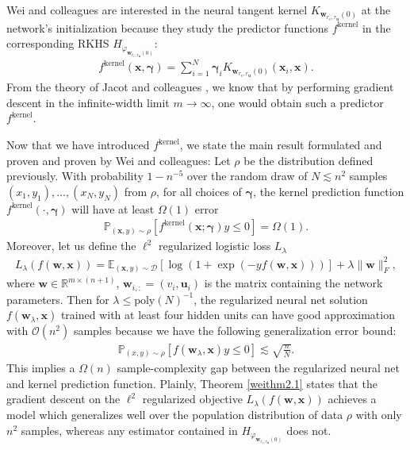 \documentclass{article}
\newenvironment{manualtheorem}[1]{%
  \renewcommand\themanualtheoreminner{#1}%
  \manualtheoreminner
}{\endmanualtheoreminner}
\begin{document}
Wei and colleagues are interested in the neural tangent kernel $K_{\boldsymbol{w}_{r_v, r_{\boldsymbol{u}}}(0)}$ at the network's initialization because they study the predictor functions $f^{\text{kernel}}$ in the corresponding RKHS $H_{\varphi_{\boldsymbol{w}_{r_v, r_{\boldsymbol{u}}}(0)}}$: 
\begin{align*}
f^{\text{kernel}}(\boldsymbol{x}, \boldsymbol{\gamma}) = \sum_{i=1}^N \boldsymbol{\gamma}_i K_{\boldsymbol{w}_{r_v, r_{\boldsymbol{u}}}(0)}(\boldsymbol{x}_i, \boldsymbol{x}).
\end{align*}
From the theory of Jacot and colleagues \cite{jacot2018neural}, we know that by performing gradient descent in the infinite-width limit $m \rightarrow \infty$, one would obtain such a predictor $f^{\text{kernel}}$.

Now that we have introduced $f^{\text{kernel}}$, we state the main result formulated and proven and proven by Wei and colleagues: 
\begin{manualtheorem}{2.1}[from \cite{wei2019regularization}]\label{weithm2.1}
Let $\rho$ be the distribution defined previously. With probability $1 - n^{-5}$ over the random draw of $N \lesssim n^2$ samples $(x_1, y_1), \ldots, (x_N, y_N)$ from $\rho$, for all choices of $\boldsymbol{\gamma}$, the kernel prediction function $f^{\text{kernel}}(\cdot, \boldsymbol{\gamma})$ will have at least $\Omega(1)$ error
\begin{align*}
    \mathbb{P}_{(\boldsymbol{x}, y) \sim \rho}[f^{\text{kernel}}(\boldsymbol{x}; \boldsymbol{\gamma})y \leq 0] = \Omega(1).
\end{align*}
Moreover, let us define the $\ell^2$ regularized logistic loss $L_{\lambda}$
\begin{align*}
    L_{\lambda}(f(\boldsymbol{w}, \boldsymbol{x})) = \mathbb{E}_{(\boldsymbol{x}, y) \sim \mathcal{D}} \left[\log \left( 1 + \exp(-y f(\boldsymbol{w}, \boldsymbol{x})) \right) \right] + \lambda \|\boldsymbol{w} \|_F^2,
\end{align*}
where $\boldsymbol{w} \in \mathbb{R}^{m \times (n+1)}$, $\boldsymbol{w}_{i,:} = (v_i, \boldsymbol{u}_i)$ is the matrix containing the network parameters. Then for $\lambda \leq \text{poly}(N)^{-1}$, the regularized neural net solution $f(\boldsymbol{w}_{\lambda}, \boldsymbol{x})$ trained with at least four hidden units can have good approximation with $\mathcal{O}(n^2)$ samples because we have the following generalization error bound:
\begin{align*}
   \mathbb{P}_{(x,y) \sim \rho}[f(\boldsymbol{w}_{\lambda}, \boldsymbol{x})y \leq 0] \lesssim \sqrt{\frac{n}{N}}.
\end{align*}
This implies a $\Omega(n)$ sample-complexity gap between the regularized neural net and kernel prediction function.
\end{manualtheorem}
Plainly, Theorem \ref{weithm2.1} states that the gradient descent on the $\ell^2$ regularized objective $L_{\lambda}(f(\boldsymbol{w}, \boldsymbol{x}))$ achieves a model which generalizes well over the population distribution of data $\rho$ with only $n^2$ samples, whereas any estimator contained in $H_{\varphi_{\boldsymbol{w}_{r_v, r_{\boldsymbol{u}}}(0)}}$ does not.
\end{document}
